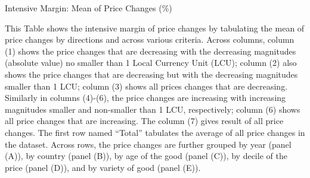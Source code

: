 \clearpage
\begin{table}
\caption{Intensive Margin: Mean of Price Changes (\%)}\label{tbl:int_mean}
{\small This Table shows the intensive margin of price changes by tabulating the mean of price changes by directions and across various criteria. Across columns, column (1) shows the price changes that are decreasing with the decreasing magnitudes (absolute value) no smaller than 1 Local Currency Unit (LCU); column (2) also shows the price changes that are decreasing but with the decreasing magnitudes smaller than 1 LCU; column (3) shows all prices changes that are decreasing. Similarly in columns (4)-(6), the price changes are increasing with increasing magnitudes smaller and non-smaller than 1 LCU, respectively; column (6) shows all price changes that are increasing. The column (7) gives result of all price changes. The first row named ``Total'' tabulates the average of all price changes in the dataset. Across rows, the price changes are further grouped by year (panel (A)), by country (panel (B)), by age of the good (panel (C)), by decile of the price (panel (D)), and by variety of good (panel (E)).}


\end{table}
